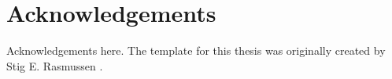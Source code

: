 \chapter{Acknowledgements}

Acknowledgements here. The template for this thesis was originally created by Stig E. Rasmussen \cite{thesis18}.
